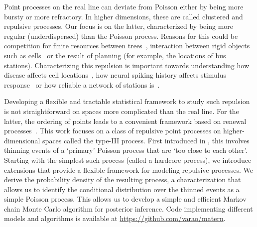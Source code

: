 \documentclass{statsoc}
\begin{document}
Point processes on the real line can deviate from Poisson either by being more bursty or more refractory. In higher dimensions, 
these are called {clustered} and {repulsive} processes.  Our focus is on the latter,
characterized by being more regular (underdispersed) than the Poisson process. Reasons for this could be competition for finite resources 
between trees~\citep{Strand72}, interaction between rigid objects such as cells~\citep{WallSar11} or 
the result of planning (for example, the locations of bus stations).
Characterizing this repulsion is important towards understanding how disease affects cell locations~\citep{WallSar11}, how neural spiking
history affects stimulus response~\citep{Brown2004a} or how reliable a network of stations is~\citep{Sahin2007}.


Developing a flexible and tractable statistical framework to study such 
repulsion is not straightforward on spaces more complicated than the real line.  
For the latter, the ordering of points leads to a convenient framework based on renewal processes~\citep{DalVer2008a}.
This work focuses on a class of repulsive point processes on higher-dimensional spaces called the \matern type-III process. First introduced in \citet{Matern60, Matern86}, 
this involves thinning events of a `primary' Poisson process that are `too close to each other'. 
Starting with the simplest such process (called a hardcore process), we introduce extensions that provide a flexible framework for modeling
repulsive processes. We derive the probability density of the resulting process, a characterization that allows us to identify the conditional 
distribution over the thinned events as a simple Poisson process. This allows us to develop a simple and efficient Markov chain Monte Carlo algorithm for 
posterior inference. Code implementing different models and algorithms is available at \url{https://github.com/varao/matern}. 
\end{document}
